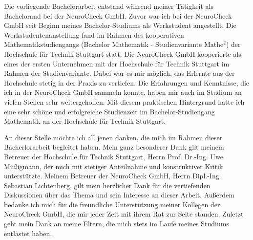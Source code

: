 Die vorliegende Bachelorarbeit entstand während meiner Tätigkeit als Bachelorand bei der NeuroCheck GmbH.
Zuvor war ich bei der NeuroCheck GmbH seit Beginn meines Bachelor-Studiums als Werkstudent angestellt.
Die Werkstudentenanstellung fand im Rahmen des kooperativen Mathematikstudiengangs (Bachelor Mathematik - Studienvariante \glqq Mathe$^2$\grqq) der Hochschule für Technik Stuttgart statt.
Die NeuroCheck GmbH kooperierte als eines der ersten Unternehmen mit der Hochschule für Technik Stuttgart im Rahmen der Studienvariante.
Dabei war es mir möglich, das Erlernte aus der Hochschule stetig in der Praxis zu vertiefen.
Die Erfahrungen und Kenntnisse, die ich in der NeuroCheck GmbH sammeln konnte, haben mir auch im Studium an vielen Stellen sehr weitergeholfen.
Mit diesem praktischen Hintergrund hatte ich eine sehr schöne und erfolgreiche Studienzeit im Bachelor-Studiengang Mathematik an der Hochschule für Technik Stuttgart.

\p
An dieser Stelle möchte ich all jenen danken, die mich im Rahmen dieser Bacherlorarbeit begleitet haben.
Mein ganz besonderer Dank gilt meinem Betreuer der Hochschule für Technik Stuttgart, Herrn Prof. Dr.-Ing. Uwe Müßigmann, der mich mit stetiger Anteilnahme und konstruktiver Kritik unterstützte.
Meinem Betreuer der NeuroCheck GmbH, Herrn Dipl.-Ing. Sebastian Lichtenberg, gilt mein herzlicher Dank für die vertiefenden Diskussionen über das Thema und sein Interesse an dieser Arbeit.
Außerdem bedanke ich mich für die freundliche Unterstützung meiner Kollegen der NeuroCheck GmbH, die mir jeder Zeit mit ihrem Rat zur Seite standen.
Zuletzt geht mein Dank an meine Eltern, die mich stets im Laufe meines Studiums entlastet haben.